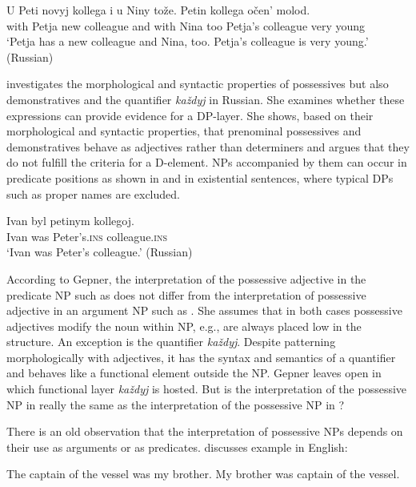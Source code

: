 \documentclass[output=paper,
colorlinks,
citecolor=brown,
newtxmath
]{langscibook}
\begin{document}
\ea \label{ex:4}
\gll U Peti novyj kollega i u Niny tože. Petin kollega očen' molod. \\
    with Petja new colleague and with Nina too Petja's colleague very young\\
\glt `Petja has a new colleague and Nina, too. Petja's colleague is very young.'\\
\glt \hfill (Russian)
\z

\noindent {} investigates the morphological and syntactic properties of possessives but also demonstratives and the quantifier \textit{každyj} in Russian. She examines whether these expressions can provide evidence for a DP-layer. She shows, based on their morphological and syntactic properties, that prenominal possessives and demonstratives behave as adjectives rather than determiners and argues that they do not fulfill the criteria for a D-element. NPs accompanied by them can occur in predicate positions as shown in  and in existential sentences, where typical DPs such as proper names are excluded.

\ea \label{ex:5}
\gll Ivan byl petinym kollegoj. \\
    Ivan was Peter's.\textsc{ins} colleague.\textsc{ins}\\
\glt `Ivan was Peter’s colleague.' \hfill (Russian)
\z

\noindent According to Gepner, the interpretation of the possessive adjective in the predicate NP such as  does not differ from the interpretation of possessive adjective in an argument NP such as . She assumes that in both cases possessive adjectives modify the noun within NP, e.g., are always placed low in the structure. An exception is the quantifier \textit{každyj}. Despite patterning morphologically with adjectives, it has the syntax and semantics of a quantifier and behaves like a functional element outside the NP. Gepner leaves open in which functional layer \textit{každyj} is hosted. But is the interpretation of the possessive NP in  really the same as the interpretation of the possessive NP in ?

There is an old observation that the interpretation of possessive NPs depends on their use as arguments or as predicates. \cite{Jespersen1965} discusses example  in English:

\ea \label{ex:6} \ea The captain of the vessel was my brother. \label{ex:6a}
\ex My brother was captain of the vessel.\label{ex:6b}
\z \z
\end{document}
